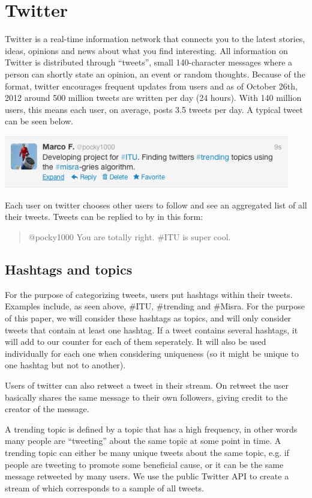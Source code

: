 \section{Twitter}
Twitter is a real-time information network that connects you to the latest stories, ideas, opinions and news about what you find interesting. All information on Twitter is distributed through ``tweets'', small 140-character messages where a person can shortly state an opinion, an event or random thoughts. Because of the format, twitter encourages frequent updates from users and as of October 26th, 2012 around 500 million tweets are written per day (24 hours)\cite{Cnet1}. With 140 million users, this means each user, on average, posts 3.5 tweets per day. A typical tweet can be seen below.

\newline
\includegraphics[width=125mm]{tweet.png}
\newline

Each user on twitter chooses other users to follow and see an aggregated list of all their tweets. Tweets can be replied to by in this form:

\begin{quote}
    @pocky1000 You are totally right. \#ITU is super cool.
\end{quote}

\subsection{Hashtags and topics}
For the purpose of categorizing tweets, users put hashtags within their tweets. Examples include, as seen above, \#ITU, \#trending and \#Misra. For the purpose of this paper, we will consider these hashtags as topics, and will only consider tweets that contain at least one hashtag. If a tweet contains several hashtags, it will add to our counter for each of them seperately. It will also be used individually for each one when considering uniqueness (so it might be unique to one hashtag but not to another).

Users of twitter can also retweet a tweet in their stream. On retweet the user basically shares the same message to their own followers, giving credit to the creator of the message.

A trending topic is defined by a topic that has a high frequency, in other words many people are ``tweeting'' about the same topic at some point in time. A trending topic can either be many unique tweets about the same topic, e.g. if people are tweeting to promote some beneficial cause, or it can be the same message retweeted by many users. We use the public Twitter API to create a stream of which corresponds to a sample of all tweets. 